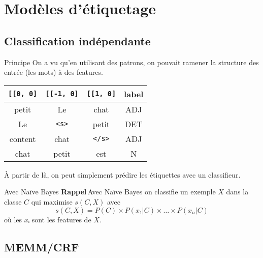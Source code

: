 \documentclass[hyperref={unicode}, xcolor={svgnames}, french]{beamer}
\begin{document}
\section{Modèles d'étiquetage}
\subsection{Classification indépendante}
\begin{frame}[fragile]{Principe}
	On a vu qu'en utilisant des patrons, on pouvait ramener la structure des entrée (les mots) à des features.

	\begin{table}
		\begin{tabu} to .9\textwidth {cccc}
			\texttt{[[0, 0]}	& \texttt{[[-1, 0]}	& \texttt{[[1, 0]}	& label\\
			\midrule
			petit	& Le	& chat	& ADJ\\
			Le	& \texttt{<s>}	& petit	& DET\\
			content	& chat	& \texttt{</s>}	& ADJ\\
			chat	& petit	& est	& N
		\end{tabu}
	\end{table}

	À partir de là, on peut simplement prédire les étiquettes avec un classifieur.
\end{frame}

\begin{frame}{Avec Naïve Bayes}
	\textbf{Rappel} Avec Naïve Bayes on classifie un exemple $X$ dans la classe $C$ qui maximise $s(C,X)$ avec
	\begin{equation}
		s(C,X) = P(C) × P(x₁|C) × … × P(x_n|C)
	\end{equation}
	où les $xᵢ$ sont les features de $X$.
\end{frame}
\subsection{MEMM/CRF}


\end{document}
